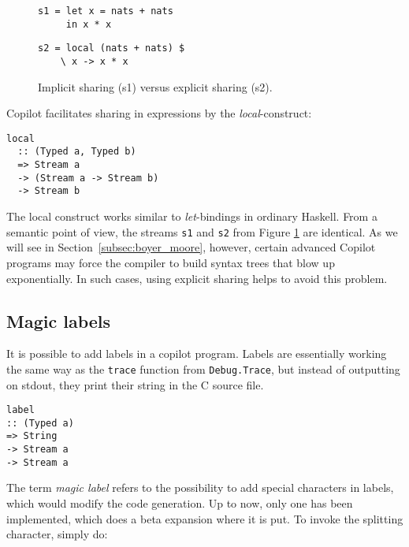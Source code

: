 \begin{figure}[ht]
\begin{minipage}{0.5\textwidth}
\begin{lstlisting}[frame=none]
s1 = let x = nats + nats
     in x * x
\end{lstlisting}
\end{minipage}
\begin{minipage}{0.5\textwidth}
\begin{lstlisting}[frame=none]
s2 = local (nats + nats) $
    \ x -> x * x
\end{lstlisting} 
\end{minipage}
\caption{Implicit sharing (s1) versus explicit sharing (s2).}
\label{fig:explicit_sharing}
\end{figure}
\noindent Copilot facilitates sharing in expressions by the \emph{local}-construct:
%
\begin{lstlisting}[frame=single]
local
  :: (Typed a, Typed b)
  => Stream a
  -> (Stream a -> Stream b)
  -> Stream b
\end{lstlisting}
%
The local construct works similar to \emph{let}-bindings in ordinary Haskell.
From a semantic point of view, the streams {\tt s1} and {\tt s2} from Figure
\ref{fig:explicit_sharing} are identical.
As we will see in Section~\ref{subsec:boyer_moore}, however, certain advanced
Copilot programs may force the compiler to build syntax trees that blow up exponentially.
In such cases, using explicit sharing helps to avoid this problem.

\subsection{Magic labels}
\label{sec:magiclabels}

It is possible to add labels in a copilot program. Labels are essentially working the same way as the \texttt{trace} function from \texttt{Debug.Trace}, but instead of outputting on stdout, they print their string in the C source file.

\begin{lstlisting}[frame=single]
label
:: (Typed a)
=> String
-> Stream a
-> Stream a
\end{lstlisting}


The term \emph{magic label} refers to the possibility to add special characters in labels, which would modify the code generation. Up to now, only one has been implemented, which does a beta expansion where it is put. To invoke the splitting character, simply do:

